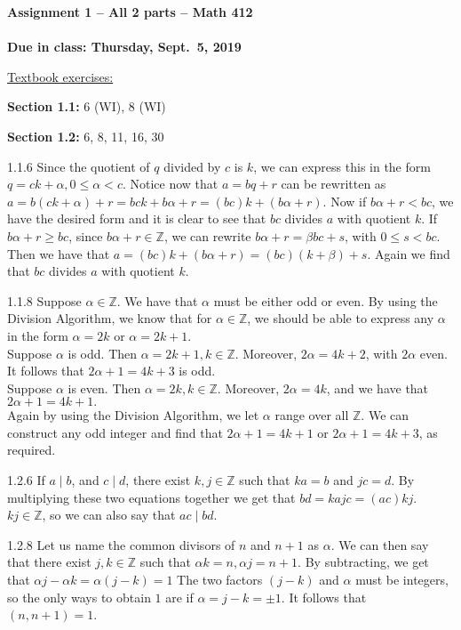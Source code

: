 \documentclass[12pt]{article}
\newcommand{\headdd}[2]{\textbf{Assignment #1 -- #2 -- Math 412}}
\newcommand{\headddf}[3]{\textbf{Assignment #1 -- All #2 parts -- Math 412}\\ \mbox{}\\ \textbf{Due in class: Thursday, #3}}
\begin{document}
\begin{center}
\headddf{1}{2}{Sept.\ 5, 2019}
\end{center}

\underline{Textbook exercises:}%

\textbf{Section 1.1:} 6 (WI), 8 (WI)

\textbf{Section 1.2:} 6, 8, 11, 16, 30
\begin{section}{1.1.6}
	Since the quotient of $q$ divided by $c$ is $k$, we can express this in the form $q = ck + \alpha, 0 \leq \alpha < c.$  Notice now that $a = bq + r$ can be rewritten as $a = b(ck + \alpha) + r = bck + b\alpha + r = (bc)k + (b\alpha + r).$  Now if $b\alpha +r < bc$, we have the desired form and it is clear to see that $bc$ divides $a$ with quotient $k$.  If $b\alpha + r \geq bc$, since $b\alpha + r \in \mathbb{Z}$, we can rewrite $b\alpha + r = \beta bc + s$, with $0 \leq s < bc$. Then we have that $a = (bc)k + (b\alpha +r) = (bc)(k+\beta) + s$.  Again we find that $bc$ divides $a$ with quotient $k$.
\end{section}
\begin{section}{1.1.8}
	Suppose $\alpha \in \mathbb{Z}$.  We have that $\alpha$ must be either odd or even.  By using the Division Algorithm, we know that for $\alpha \in \mathbb{Z}$, we should be able to express any $\alpha$ in the form $\alpha = 2k$ or $\alpha = 2k + 1$.\\
	Suppose $\alpha$ is odd.  Then $\alpha = 2k + 1, k \in \mathbb{Z}$.  Moreover, $2\alpha = 4k + 2$, with $2\alpha$ even.  It follows that $2\alpha +1 = 4k + 3$ is odd.\\
	Suppose $\alpha$  is even.  Then $\alpha = 2k, k \in \mathbb{Z}$.  Moreover, $2\alpha = 4k$, and we have that $2\alpha + 1 = 4k + 1.$\\
	Again by using the Division Algorithm, we let $\alpha$ range over all $\mathbb{Z}$.  We can construct any odd integer and find that $2\alpha +1 = 4k + 1$ or $2 \alpha + 1 = 4k +3$, as required.
\end{section}
\begin{section}{1.2.6}
	If $a \mid b$, and $c \mid d$, there exist $k, j \in \mathbb{Z}$ such that $ka = b$ and $jc = d$.  By multiplying these two equations together we get that $bd = kajc = (ac)kj$.  $kj \in \mathbb{Z}$, so we can also say that $ac \mid bd$.
\end{section} 
\begin{section}{1.2.8}
	Let us name the common divisors of $n$ and $n + 1$ as $\alpha$.  We can then say that there exist $j, k \in \mathbb{Z}$ such that $\alpha k = n, \alpha j = n + 1$.  By subtracting, we get that $\alpha j - \alpha k = \alpha(j - k) = 1$  The two factors $(j - k)$ and $ \alpha$ must be integers, so the only ways to obtain $1$ are if $\alpha = j-k = \pm 1$.  It follows that $(n, n+1) = 1$.
\end{section}
\end{document}
